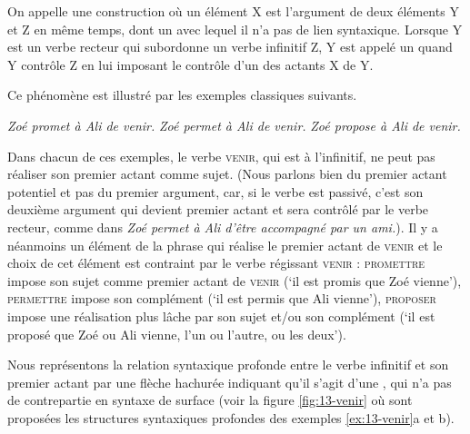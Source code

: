 {On appelle  une construction où un élément X est l’argument de deux éléments Y et Z en même temps, dont un avec lequel il n’a pas de lien syntaxique. Lorsque Y est un verbe recteur qui subordonne un verbe infinitif Z, Y est appelé un  quand Y contrôle Z en lui imposant le contrôle d’un des actants X de Y.}

Ce phénomène est illustré par les exemples classiques suivants.

\ea\label{ex:13-venir}
\ea\textit{Zoé promet à Ali de venir.}
\ex\textit{Zoé permet à Ali de venir.}
\ex\textit{Zoé propose à Ali de venir.}\z\z

Dans chacun de ces exemples, le verbe \textsc{venir}, qui est à l’infinitif, ne peut pas réaliser son premier actant comme sujet. (Nous parlons bien du premier actant potentiel et pas du premier argument, car, si le verbe est passivé, c’est son deuxième argument qui devient premier actant et sera contrôlé par le verbe recteur, comme dans \textit{Zoé permet à Ali d’être accompagné par un ami.}). Il y a néanmoins un élément de la phrase qui réalise le premier actant de \textsc{venir} et le choix de cet élément est contraint par le verbe régissant \textsc{venir} : \textsc{promettre} impose son sujet comme premier actant de \textsc{venir}  (‘il est promis que Zoé vienne’), \textsc{permettre} impose son complément  (‘il est permis que Ali vienne’), \textsc{proposer} impose une réalisation plus lâche par son sujet et/ou son complément  (‘il est proposé que Zoé ou Ali vienne, l’un ou l’autre, ou les deux’).

Nous représentons la relation syntaxique profonde entre le verbe infinitif et son premier actant par une flèche hachurée indiquant qu’il s’agit d’une , qui n’a pas de contrepartie en syntaxe de surface (voir la figure \ref{fig:13-venir} où sont proposées les structures syntaxiques profondes des exemples \ref{ex:13-venir}a et b).


